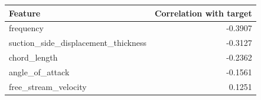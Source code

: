 \begin{tabular}{lr}
\toprule
Feature & Correlation with target \\
\midrule
frequency & -0.3907 \\
suction\_side\_displacement\_thickness & -0.3127 \\
chord\_length & -0.2362 \\
angle\_of\_attack & -0.1561 \\
free\_stream\_velocity & 0.1251 \\
\bottomrule
\end{tabular}